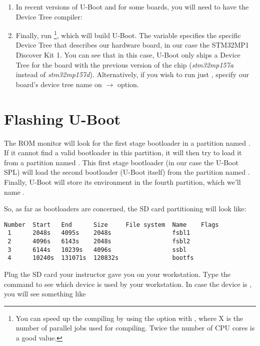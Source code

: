 \begin{enumerate}
\item In recent versions of U-Boot and for some boards, you will
  need to have the Device Tree compiler:


\item Finally, run \footnote{You can speed up the
    compiling by using the  option with , where X
    is the number of parallel jobs used for compiling. Twice the
    number of CPU cores is a good value.}, which will build
  U-Boot. The  variable specifies the specific
  Device Tree that describes our hardware board, in our case the
  STM32MP1 Discover Kit 1. You can see that in this case, U-Boot
  only ships a Device Tree for the board with the previous version
  of the chip ({\em stm32mp157a} instead of {\em stm32mp157d}).
  Alternatively, if you wish to run just ,
  specify our board's device tree name on
   $\rightarrow$ 
  option.
\end{enumerate}

\section{Flashing U-Boot}

The ROM monitor will look for the first stage bootloader in a
partition named . If it cannot find a valid bootloader in
this partition, it will then try to load it from a partition named
. This first stage bootloader (in our case the U-Boot SPL)
will load the second bootloader (U-Boot itself) from the partition
named . Finally, U-Boot will store its environment in the
fourth partition, which we'll name .

So, as far as bootloaders are concerned, the SD card partitioning will
look like:

\begin{verbatim}
Number  Start   End      Size     File system  Name    Flags
 1      2048s   4095s    2048s                 fsbl1
 2      4096s   6143s    2048s                 fsbl2
 3      6144s   10239s   4096s                 ssbl
 4      10240s  131071s  120832s               bootfs
\end{verbatim}

Plug the SD card your instructor gave you on your workstation. Type
the  command to see which device is used by your
workstation. In case the device is , you will see
something like

